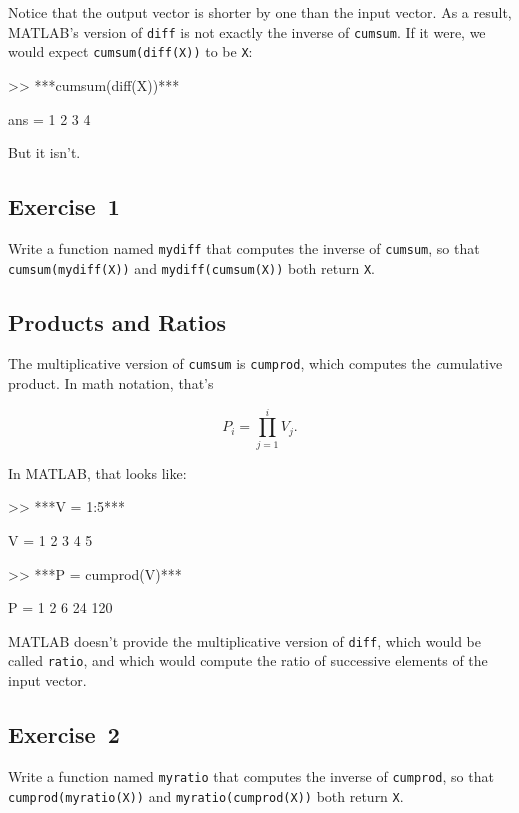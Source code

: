 Notice that the output vector is shorter by one than the input
vector.  As a result, MATLAB's version of \lstinline{diff} is not
exactly the inverse of \lstinline{cumsum}.  If it were, we would
expect \lstinline{cumsum(diff(X))} to be \lstinline{X}:

\begin{code}
>> ***cumsum(diff(X))***

ans = 1     2     3     4
\end{code}

But it isn't.

\subsection{Exercise~1}
Write a function named \lstinline{mydiff} that computes the
inverse of \lstinline{cumsum}, so that \lstinline{cumsum(mydiff(X))} and
\lstinline{mydiff(cumsum(X))} both return \lstinline{X}.



\subsection{Products and Ratios}

The multiplicative version of \lstinline{cumsum} is \lstinline{cumprod},
which computes the {\emph cumulative product}.  In math notation,
that's


\begin{equation*}
P_i = \prod_{j=1}^i V_j .
\end{equation*}

In MATLAB, that looks like:

\begin{code}
>> ***V = 1:5***

V = 1     2     3     4     5

>> ***P = cumprod(V)***

P = 1     2     6    24   120
\end{code}

MATLAB doesn't provide the multiplicative version
of \lstinline{diff}, which would be called \lstinline{ratio}, and which would
compute the ratio of successive elements of the input vector.

\subsection{Exercise~2}
Write a function named \lstinline{myratio} that computes the
inverse of \lstinline{cumprod}, so that \lstinline{cumprod(myratio(X))} and
\lstinline{myratio(cumprod(X))} both
return \lstinline{X}.

